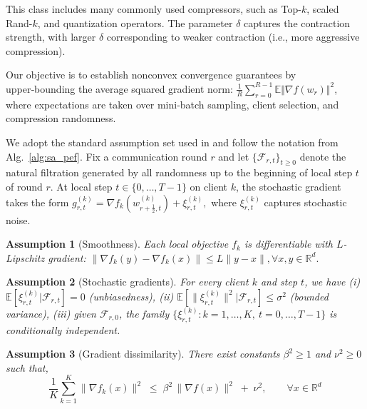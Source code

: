 \documentclass{article} %
\newtheorem{assumption}{Assumption}
\begin{document}
This class includes many commonly used compressors, such as Top-$k$, scaled Rand-$k$, and quantization operators. 
The parameter $\delta$ captures the contraction strength, with larger $\delta$ corresponding to weaker contraction (i.e., more aggressive compression).  

Our objective is to establish nonconvex convergence guarantees by upper‑bounding the average squared gradient norm:
\(\tfrac1R\sum_{r=0}^{R-1}\mathbb{E}\Vert\nabla f(w_r)\Vert^2\),
where expectations are taken over mini‑batch sampling, client selection, and compression randomness.

We adopt the standard assumption set used in \citet{alistarh2018convergence, li2023analysis, beznosikov2023biased} and follow the
notation from Alg.~\ref{alg:sa_pef}. Fix a communication round $r$ and let $\{\mathcal F_{r,t}\}_{t\ge 0}$ denote the natural filtration generated by all randomness up to the beginning of local step $t$ of round $r$.  At local step $t\in\{0,\dots,T-1\}$ on client $k$, the stochastic gradient takes the form
\(
g_{r,t}^{(k)} = \nabla f_k\left(w_{r+\frac12,t}^{(k)}\right) + \xi_{r,t}^{(k)},
\)
where $\xi_{r,t}^{(k)}$ captures stochastic noise.

\begin{assumption}[Smoothness]\label{A1}
Each local objective $f_k$ is differentiable with $L$-Lipschitz gradient: 
\(
\bigl\|\nabla f_k(y)-\nabla f_k(x)\bigr\|\le L\|y-x\|, \forall x,y\in\mathbb R^d.
\)
\end{assumption}

\begin{assumption}[Stochastic gradients]\label{A2}
For every client $k$ and step $t$, we have (i) $\mathbb E[\xi_{r,t}^{(k)}|\mathcal F_{r,t}]=0$ (unbiasedness), (ii) $\mathbb E[\|\xi_{r,t}^{(k)}\|^{2}|\mathcal F_{r,t}]\le \sigma^{2}$ (bounded variance), (iii) given $\mathcal F_{r,0}$, the family $\{\xi_{r,t}^{(k)}: k=1,\dots,K,\ t=0,\dots,T-1\}$ is conditionally independent.
\end{assumption}

\begin{assumption}[Gradient dissimilarity]\label{A3}
There exist constants $\beta^{2}\ge 1$ and $\nu^{2}\ge 0$ such that,
\[
\frac{1}{K}\sum_{k=1}^{K}\bigl\|\nabla f_k(x)\bigr\|^{2}
\;\le\;
\beta^{2}\,\bigl\|\nabla f(x)\bigr\|^{2} \;+\; \nu^{2},\qquad \forall x\in\mathbb R^{d}
\]
\end{assumption}
\end{document}
